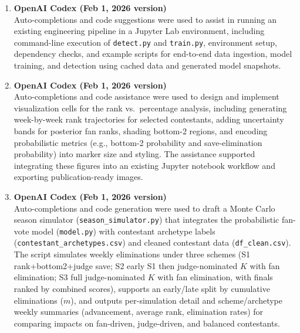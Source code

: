 \documentclass[12pt]{article}
\begin{document}
\begin{enumerate}
	
	\item \textbf{OpenAI Codex (Feb 1, 2026 version)}\\
	Auto-completions and code suggestions were used to assist in running an existing engineering pipeline in a Jupyter Lab environment, including command-line execution of \texttt{detect.py} and \texttt{train.py}, environment setup, dependency checks, and example scripts for end-to-end data ingestion, model training, and detection using cached data and generated model snapshots.
	
	\item \textbf{OpenAI Codex (Feb 1, 2026 version)}\\
	Auto-completions and code assistance were used to design and implement visualization cells for the rank vs.\ percentage analysis, including generating week-by-week rank trajectories for selected contestants, adding uncertainty bands for posterior fan ranks, shading bottom-2 regions, and encoding probabilistic metrics (e.g., bottom-2 probability and save-elimination probability) into marker size and styling. The assistance supported integrating these figures into an existing Jupyter notebook workflow and exporting publication-ready images.
	
	\item \textbf{OpenAI Codex (Feb 1, 2026 version)}\\
	Auto-completions and code generation were used to draft a Monte Carlo season simulator (\texttt{season\_simulator.py}) that integrates the probabilistic fan-vote model (\texttt{model.py}) with contestant archetype labels (\texttt{contestant\_archetypes.csv}) and cleaned contestant data (\texttt{df\_clean.csv}). The script simulates weekly eliminations under three schemes (S1 rank+bottom2+judge save; S2 early S1 then judge-nominated \(K\) with fan elimination; S3 full judge-nominated \(K\) with fan elimination, with finals ranked by combined scores), supports an early/late split by cumulative eliminations (\(m\)), and outputs per-simulation detail and scheme/archetype weekly summaries (advancement, average rank, elimination rates) for comparing impacts on fan-driven, judge-driven, and balanced contestants.
	
	
\end{enumerate}
\end{document}
